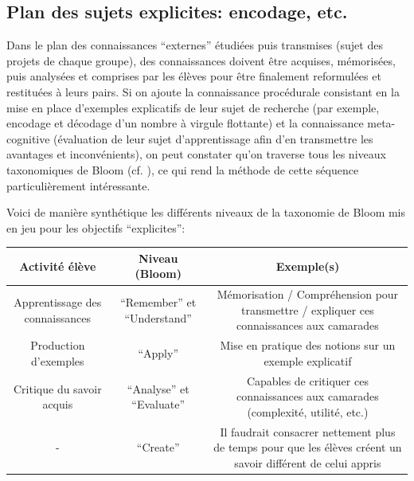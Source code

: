 \documentclass[11pt,bibliography=totoc]{scrartcl}
\newcommand\ajout[1]{{\color{blue} #1}}
\begin{document}
\subsection{Plan des sujets explicites: encodage, etc.}
Dans le plan des connaissances ``externes'' étudiées puis transmises (sujet des
projets de chaque groupe), des connaissances doivent être acquises, mémorisées,
puis analysées et comprises par les élèves pour être finalement reformulées et
restituées à leurs pairs. Si on ajoute la connaissance procédurale consistant en
la mise en place d'exemples explicatifs de leur sujet de recherche (par exemple,
encodage et décodage d'un nombre à virgule flottante) et la connaissance
meta-cognitive (évaluation de leur sujet d'apprentissage afin d'en transmettre
les avantages et inconvénients), on peut constater qu'on traverse tous les
niveaux taxonomiques de Bloom (cf. \cite{bloom}), ce qui rend la méthode de cette séquence
particulièrement intéressante. 
\ajout{
Voici de manière synthétique les différents niveaux de la taxonomie de Bloom mis en jeu pour les objectifs ``explicites'':

\begin{center}
   \begin{tabular}{| c | c | c | }
     \hline
     Activité élève & Niveau (Bloom) & Exemple(s) \\ 
     \hline
     Apprentissage des connaissances & ``Remember'' et ``Understand'' & Mémorisation / Compréhension pour transmettre / expliquer ces connaissances aux camarades \\ 
     \hline
     Production d'exemples & ``Apply'' & Mise en pratique des notions sur un exemple explicatif \\
     \hline
     Critique du savoir acquis & ``Analyse'' et ``Evaluate'' & Capables de critiquer ces connaissances aux camarades (complexité, utilité, etc.) \\
     \hline
     - & ``Create'' & Il faudrait consacrer nettement plus de temps pour que les élèves créent un savoir différent de celui appris \\
     \hline
   \end{tabular}
 \end{center}
}
\end{document}
